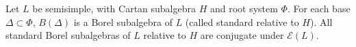 Let $L$ be semisimple, with Cartan subalgebra $H$ and root system $\Phi$. For each base $\Delta \subset \Phi$, $B(\Delta)$ is a Borel subalgebra of $L$ (called standard relative to $H$). All standard Borel subalgebras of $L$ relative to $H$ are conjugate under $\mathcal{E}(L)$.
